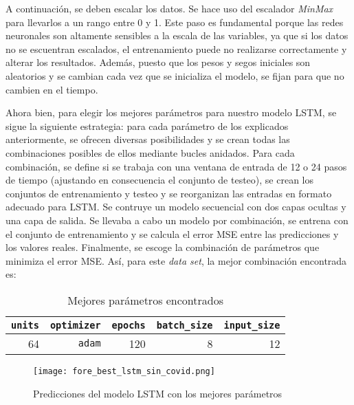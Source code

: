 \documentclass[12pt,twoside]{article}
\begin{document}
A continuación, se deben escalar los datos. Se hace uso del escalador \textit{MinMax} para llevarlos a un rango entre 0 y 1. Este paso es fundamental porque las redes neuronales son altamente sensibles a la escala de las variables, ya que si los datos no se escuentran escalados, el entrenamiento puede no realizarse correctamente y alterar los resultados. Además, puesto que los pesos y segos iniciales son aleatorios y se cambian cada vez que se inicializa el modelo, se fijan para que no cambien en el tiempo.

Ahora bien, para elegir los mejores parámetros para nuestro modelo LSTM, se sigue la siguiente estrategia: para cada parámetro de los explicados anteriormente, se ofrecen diversas posibilidades y se crean todas las combinaciones posibles de ellos mediante bucles anidados. Para cada combinación, se define si se trabaja con una ventana de entrada de 12 o 24 pasos de tiempo (ajustando en consecuencia el conjunto de testeo), se crean los conjuntos de entrenamiento y testeo y se reorganizan las entradas en formato adecuado para LSTM. Se contruye un modelo secuencial con dos capas ocultas y una capa de salida. Se llevaba a cabo un modelo por combinación, se entrena con el conjunto de entrenamiento y se calcula el error MSE entre las predicciones y los valores reales. Finalmente, se escoge la combinación de parámetros que minimiza el error MSE. Así, para este \textit{data set}, la mejor combinación encontrada es:

\begin{table}[ht] 
\centering
\begin{tabular}{rrrrr} 
  \hline
 \texttt{units} & \texttt{optimizer} & \texttt{epochs} & \texttt{batch\_size} & \texttt{input\_size} \\ 
  \hline
64 & \texttt{adam} & 120 & 8 & 12 \\ 
   \hline
\end{tabular}
\caption{Mejores parámetros encontrados} \label{tab:01}
\end{table}

\begin{figure}[h]
    \centering
    \texttt{[image: fore\_best\_lstm\_sin\_covid.png]}
    \caption{Predicciones del modelo LSTM con los mejores parámetros} 
    \label{fig:fig15}
\end{figure}

\end{document}
